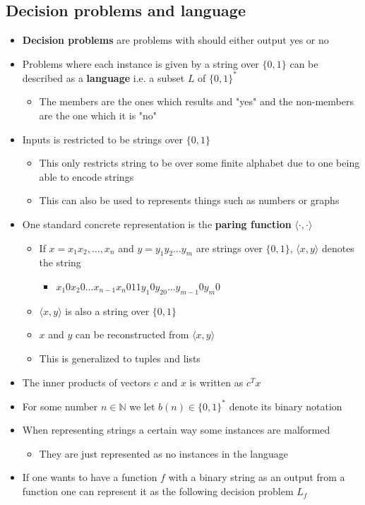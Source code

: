 \documentclass[11pt]{article}
\begin{document}
\subsection{Decision problems and language}
\label{sec:orgb0d78e0}
\begin{itemize}
\item \textbf{Decision problems} are problems with should either output yes or no
\item Problems where each instance is given by a string over \(\{0,1\}\) can be described as a \textbf{language} i.e. a subset \(L\) of \(\{0,1\}^*\)
\begin{itemize}
\item The members are the ones which results and "yes" and the non-members are the one which it is "no"
\end{itemize}
\item Inputs is restricted to be strings over \(\{0,1\}\)
\begin{itemize}
\item This only restricts string to be over some finite alphabet due to one being able to encode strings
\item This can also be used to represents things such as numbers or graphs
\end{itemize}

\item One standard concrete representation is the \textbf{paring function} \(\langle \cdot, \cdot \rangle\)
\begin{itemize}
\item If \(x = x_1x_2, \dots, x_n\) and \(y=y_1y_2 \dots y_m\) are strings over \(\{0,1\}\), \(\langle x, y \rangle\) denotes the string
\begin{itemize}
\item \(x_1 0 x_2 0 \dots x_{n-1}x_n 011 y_1 0y_20 \dots y_{m-1} 0 y_m 0\)
\end{itemize}
\item \(\langle x, y \rangle\) is also a string over \(\{0,1\}\)
\item \(x\) and \(y\) can be reconstructed from \(\langle x, y \rangle\)
\item This is generalized to tuples and lists
\end{itemize}

\item The inner products of vectors \(c\) and \(x\) is written as \(c^Tx\)
\item For some number \(n \in \mathbb N\) we let \(b(n) \in \{0,1\}^*\) denote its binary notation
\item When representing strings a certain way some instances are malformed
\begin{itemize}
\item They are just represented as no instances in the language
\end{itemize}
\item If one wants to have a function \(f\) with a binary string as an output from a function one can represent it as the following decision problem \(L_f\)
\end{itemize}
\end{document}
